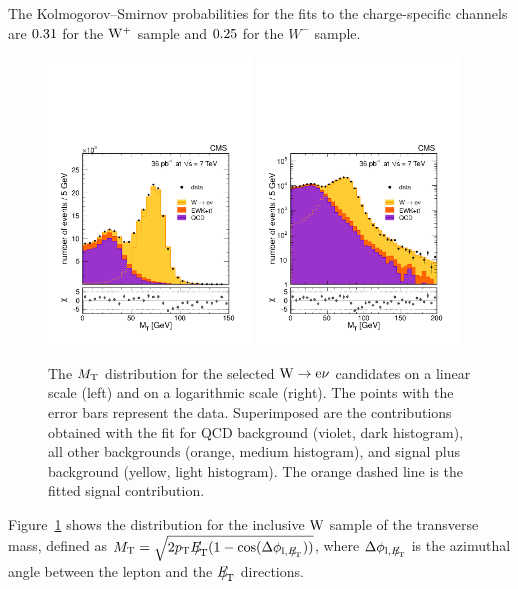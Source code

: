 The Kolmogorov--Smirnov probabilities for the fits to the charge-specific
channels are $ 0.31  $ for the $\mathrm{W^+}$ sample and
$ 0.25  $ for the $W^-$ sample.
\begin{figure}[t!]
\begin{center}
\includegraphics[width=0.48\textwidth]{figs/inc_pfmt_withMVA.pdf}
\includegraphics[width=0.48\textwidth]{figs/inc_pfmt_log_withMVA.pdf}
\caption{ \label{fig:WenMT}
The $M_\mathrm{T}$ distribution for the selected $\mathrm{W} \rightarrow \mathrm{e}\nu$ candidates on
a linear scale (left) and on a logarithmic scale (right).
The points with the error bars represent the data. Superimposed are the
contributions obtained with the fit
for QCD background (violet, dark histogram), all other backgrounds
(orange, medium histogram), and signal plus  background (yellow, light histogram).
The orange dashed line is the fitted signal contribution.
}
\end{center}
\end{figure}
Figure~\ref{fig:WenMT} shows the distribution for the inclusive $\mathrm{W}$ sample
of the transverse mass, defined as
$\MT=\sqrt{2\Pt\MET (1-\cos(\Delta\phi_{\mathrm{l},\MET}))}$,
where $\Delta\phi_{\mathrm{l},{E\!\!\!/}_{\!\mathrm{T}}}$ is the azimuthal angle between the
lepton and the ${E\!\!\!/}_{\!\mathrm{T}}$ directions.

